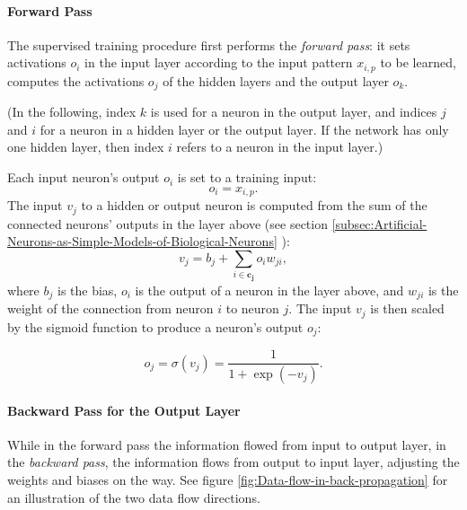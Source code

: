 \paragraph{Forward Pass}

The supervised training procedure first performs the \emph{forward
pass}: it sets activations $o_{i}$ in the input
layer according to the input pattern $x_{i,p}$ to be learned, computes
the activations $o_{j}$ of the hidden layers and the output layer
$o_{k}$.

(In the following, index $k$ is used for a neuron in the output layer,
and indices $j$ and $i$ for a neuron in a hidden layer or the output
layer. If the network has only one hidden layer, then index $i$ refers
to a neuron in the input layer.)

Each input neuron's output $o_{i}$ is set to a training input: 
\begin{equation}
o_{i}=x_{i,p}.
\end{equation}
The input $v_{j}$ to a hidden or output neuron is computed from the
sum of the connected neurons' outputs in the layer above (see section
\ref{subsec:Artificial-Neurons-as-Simple-Models-of-Biological-Neurons}
):
\begin{equation}
v_{j}=b_{j}+\sum_{i\in\mathbf{c_{j}}}o_{i}w_{ji},
\end{equation}
 where $b_{j}$ is the bias, $o_{i}$ is the output of a neuron in
the layer above, and $w_{ji}$ is the weight of the connection from
neuron $i$ to neuron $j$. The input $v_{j}$ is then scaled by the
sigmoid function to produce a neuron's output $o_{j}$:

\begin{equation}
o_{j}=\sigma(v_{j})=\frac{1}{1+\exp(-v_{j})}.\label{eq:sigmoid-function-2}
\end{equation}

\paragraph{Backward Pass for the Output Layer}

While in the forward pass the information flowed from input to output
layer, in the \emph{backward pass}, the information
flows from output to input layer, adjusting the weights and biases
on the way. See figure \ref{fig:Data-flow-in-back-propagation} for
an illustration of the two data flow directions.

